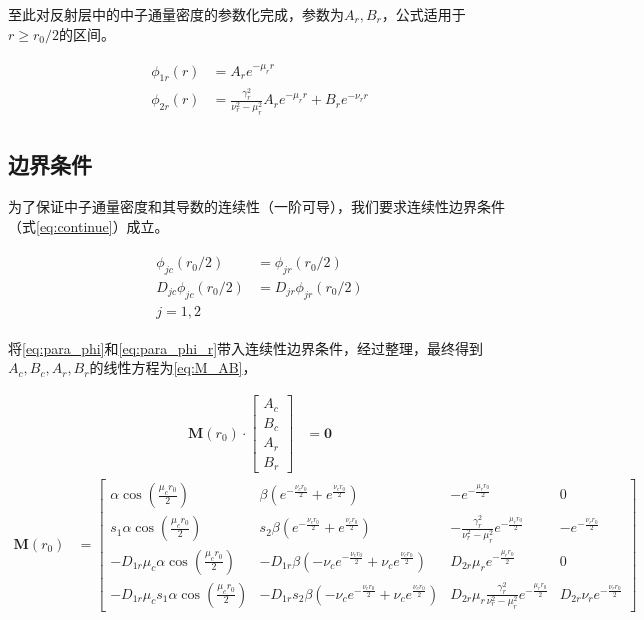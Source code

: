 至此对反射层中的中子通量密度的参数化完成，参数为$A_r,B_r$，公式适用于$r \geq r_0/2$的区间。

\begin{align}
    \label{eq:para_phi_r}
    \begin{split}
        \phi_{1r}(r) &= A_r e^{-\mu_r r} \\
        \phi_{2r}(r) &= \frac{\gamma_r^2}{\nu_r^2 - \mu_r^2}A_r e^{-\mu_r r} + B_r e^{-\nu_r r}
    \end{split}
\end{align}

\subsection{边界条件}

为了保证中子通量密度和其导数的连续性（一阶可导），我们要求连续性边界条件（式\ref{eq:continue}）成立。

\begin{align}
    \label{eq:continue}
    \begin{split}
        \phi_{jc}(r_0 / 2) &= \phi_{jr}(r_0 / 2) \\
        D_{jc}\phi_{jc}(r_0 / 2) &= D_{jr}\phi_{jr}(r_0 / 2) \\
        j = 1,2
    \end{split}
\end{align}

将\ref{eq:para_phi}和\ref{eq:para_phi_r}带入连续性边界条件，经过整理，最终得到$A_c,B_c,A_r,B_r$的线性方程为\ref{eq:M_AB}，

\begin{align}
    \label{eq:M_AB}
    \pmb{M}(r_0) \cdot \begin{bmatrix}
        A_c \\
        B_c \\
        A_r \\
        B_r
    \end{bmatrix} &= \pmb{0}
\end{align}
\begin{align}
    \pmb{M}(r_0) &= 
    \begin{bmatrix}
        \alpha\cos(\frac{\mu_c r_0}{2}) & \beta(e^{-\frac{\nu_c r_0}{2}}+e^{\frac{\nu_c r_0}{2}}) & -e^{-\frac{\mu_r r_0}{2}} & 0 \\
        s_1\alpha\cos(\frac{\mu_c r_0}{2}) & s_2\beta(e^{-\frac{\nu_c r_0}{2}}+e^{\frac{\nu_c r_0}{2}}) & -\frac{\gamma_r^2}{\nu_r^2 - \mu_r^2}e^{-\frac{\mu_r r_0}{2}} & -e^{-\frac{\nu_r r_0}{2}} \\
        -D_{1r}\mu_c\alpha\cos(\frac{\mu_c r_0}{2}) & -D_{1r}\beta(-\nu_c e^{-\frac{\nu_c r_0}{2}}+\nu_c e^{\frac{\nu_c r_0}{2}}) & D_{2r}\mu_r e^{-\frac{\mu_r r_0}{2}} & 0 \\
        -D_{1r}\mu_c s_1\alpha\cos(\frac{\mu_c r_0}{2}) & -D_{1r}s_2\beta(-\nu_c e^{-\frac{\nu_c r_0}{2}}+\nu_c e^{\frac{\nu_c r_0}{2}}) & D_{2r}\mu_r\frac{\gamma_r^2}{\nu_r^2 - \mu_r^2}e^{-\frac{\mu_r r_0}{2}} & D_{2r}\nu_r e^{-\frac{\nu_r r_0}{2}}
    \end{bmatrix}
\end{align}

